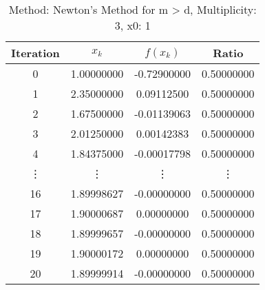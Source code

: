 \begin{table}
\centering
\caption{Method: Newton's Method for m > d, Multiplicity: 3, x0: 1}
\label{tab:table_Newton's_Method_for_m_>_d_3_1}
\begin{tabular}{c c c c}
\toprule
Iteration &      $x_k$ &    $f(x_k)$ &      Ratio \\
\midrule
        0 & 1.00000000 & -0.72900000 & 0.50000000 \\
        1 & 2.35000000 &  0.09112500 & 0.50000000 \\
        2 & 1.67500000 & -0.01139063 & 0.50000000 \\
        3 & 2.01250000 &  0.00142383 & 0.50000000 \\
        4 & 1.84375000 & -0.00017798 & 0.50000000 \\
   \vdots &     \vdots &      \vdots &     \vdots \\
       16 & 1.89998627 & -0.00000000 & 0.50000000 \\
       17 & 1.90000687 &  0.00000000 & 0.50000000 \\
       18 & 1.89999657 & -0.00000000 & 0.50000000 \\
       19 & 1.90000172 &  0.00000000 & 0.50000000 \\
       20 & 1.89999914 & -0.00000000 & 0.50000000 \\
\bottomrule
\end{tabular}
\end{table}
